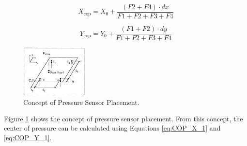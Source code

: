 \begin{enumerate}[label=\Alph*.]
    \begin{equation}
      X_{\mathrm{cop}} = X_0 + \frac{(F2 + F4) \cdot dx}{F1 + F2 + F3 + F4}
      \label{eq:COP_X_1}
    \end{equation}

    \begin{equation}
      Y_{\mathrm{cop}} = Y_0 + \frac{(F1 + F2) \cdot dy}{F1 + F2 + F3 + F4}
      \label{eq:COP_Y_1}
    \end{equation}


    \begin{figure} [h] \centering
      \includegraphics[width=0.3\textwidth]{gambar/Konsep_Letak.png}
      \caption{Concept of Pressure Sensor Placement\cite{resna2005}.}
      \label{fig:Konsep_Letak}
    \end{figure}

    \hspace*{1em} Figure \ref{fig:Konsep_Letak} shows the concept of pressure sensor placement. From this concept, the center of pressure can be calculated using Equations \ref{eq:COP_X_1} and \ref{eq:COP_Y_1}.
\end{enumerate}
